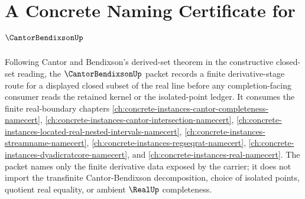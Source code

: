 \chapter{A Concrete Naming Certificate for $\CantorBendixsonUp$}
\label{ch:concrete-instances-cantor-bendixson-namecert}

Following Cantor and Bendixson's derived-set theorem in the constructive closed-set reading, the $\CantorBendixsonUp$ packet records a finite derivative-stage route for a displayed closed subset of the real line before any completion-facing consumer reads the retained kernel or the isolated-point ledger. It consumes the finite real-boundary chapters \autoref{ch:concrete-instances-cantor-completeness-namecert}, \autoref{ch:concrete-instances-cantor-intersection-namecert}, \autoref{ch:concrete-instances-located-real-nested-intervals-namecert}, \autoref{ch:concrete-instances-streamname-namecert}, \autoref{ch:concrete-instances-regseqrat-namecert}, \autoref{ch:concrete-instances-dyadicratcore-namecert}, and \autoref{ch:concrete-instances-real-namecert}. The packet names only the finite derivative data exposed by the carrier; it does not import the transfinite Cantor-Bendixson decomposition, choice of isolated points, quotient real equality, or ambient $\RealUp$ completeness.

